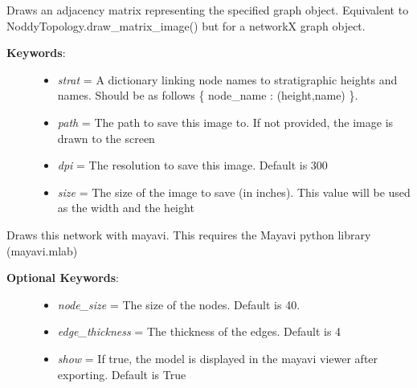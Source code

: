 \documentclass[a4paper,10pt,english]{sphinxmanual}
\begin{document}
\begin{fulllineitems}
\begin{fulllineitems}
\label{pynoddy:pynoddy.output.NoddyTopology.draw_graph_matrix}
Draws an adjacency matrix representing the specified graph object. Equivalent to
NoddyTopology.draw\_matrix\_image() but for a networkX graph object.
\begin{description}
\item[{\textbf{Keywords}:}] \leavevmode\begin{itemize}
\item {} 
\emph{strat} = A dictionary linking node names to stratigraphic heights and names. Should be as follows \{ node\_name : (height,name) \}.

\item {} 
\emph{path} = The path to save this image to. If not provided, the image is drawn to the screen

\item {} 
\emph{dpi} = The resolution to save this image. Default is 300

\item {} 
\emph{size} = The size of the image to save (in inches). This value will be used as the width and the height

\end{itemize}

\end{description}

\end{fulllineitems}


\begin{fulllineitems}
\label{pynoddy:pynoddy.output.NoddyTopology.draw_mayavi}
Draws this network with mayavi. This requires the Mayavi python library
(mayavi.mlab)
\begin{description}
\item[{\textbf{Optional Keywords}:}] \leavevmode\begin{itemize}
\item {} 
\emph{node\_size} = The size of the nodes. Default is 40.

\item {} 
\emph{edge\_thickness} = The thickness of the edges. Default is 4

\item {} 
\emph{show} = If true, the model is displayed in the mayavi viewer after exporting. Default is True


\end{itemize}
\end{description}
\end{fulllineitems}
\end{fulllineitems}
\end{document}
